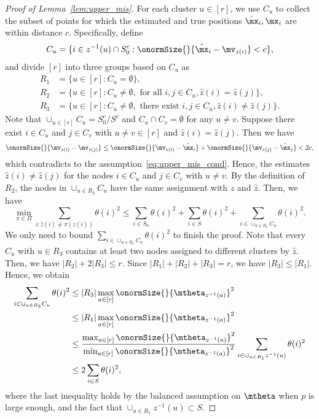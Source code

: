 \documentclass[lettersize,onecolumn,journal]{IEEEtran}
\theoremstyle{definition}
\theoremstyle{definition}
\def\fixme#1#2{\textbf{\color{red}[FIXME (#1): #2]}}
\begin{document}
\begin{proof}[Proof of Lemma~\ref{lem:upper_mis}] 

For each cluster $u\in[r]$, we use $C_u$ to collect the subset of points for which the estimated and true positions $\hat \mx_i, \mx_i$ are within distance $c$. Specifically, define
\begin{equation}
    C_u = \{ i \in z^{-1}(u) \cap S_0^c: \onormSize{}{\hat \mx_i - \mv_{z(i)}} < c \},
\end{equation}
and divide $[r]$ into three groups based on $C_u$ as 
\begin{align}
    R_1 &= \{ u \in [r]: C_u = \emptyset \},\\
    R_2 &= \{ u \in [r]: C_u \neq \emptyset, \text{ for all } i, j \in C_u, \hat z(i) = \hat z(j) \},\\
    R_3 &= \{ u \in [r]: C_u \neq \emptyset, \text{ there exist } i, j \in C_u, \hat z(i) \neq \hat z(j) \}.
\end{align}
Note that $\cup_{u \in [r]}C_u = S_0^c/S^c$ and $C_u \cap C_v = \emptyset$ for any $u \neq v$. Suppose there exist $ i \in C_u$ and $j \in C_v$ with $u \neq v \in [r]$ and $\hat z(i) = \hat z(j)$. Then we have 
\begin{equation}
    \onormSize{}{\mv_{z(i)} - \mv_{z(j)} } \leq  \onormSize{}{\mv_{z(i)} - \hat \mx_{i} } + \onormSize{}{\mv_{z(j)} - \hat \mx_j } < 2c,
\end{equation}
which contradicts to the assumption~\eqref{eq:upper_mis_cond}. Hence, the estimates $\hat z(i) \neq \hat z(j)$ for the nodes $ i \in C_u$ and $j \in C_v$ with $u \neq v$. By the definition of $R_2$, the nodes in $\cup_{u \in R_2} C_u$ have the same assignment with $z$ and $\hat z$. Then, 
we have 
\begin{equation}
    \min_{\pi \in \Pi} \sum_{i : \hat z(i) \neq \pi(z(i))} \theta(i)^2 \leq \sum_{i \in S_0} \theta(i)^2 + \sum_{i \in S} \theta(i)^2 + \sum_{ i \in \cup_{u \in R_3} C_u} \theta(i)^2.
\end{equation}
 We only need to bound $\sum_{ i \in \cup_{u \in R_3} C_u} \theta(i)^2$ to finish the proof. Note that every $C_u$ with $u \in R_3$ contains at least two nodes assigned to different clusters by $\hat z$. Then, we have $|R_2| + 2 |R_3| \leq r$. Since $|R_1| + |R_2| + |R_3| = r$, we have $|R_3| \leq |R_1|$. Hence, we obtain
\begin{align}
    \sum_{ i \in \cup_{u \in R_3} C_u} \theta(i)^2 &\leq |R_3| \max_{a \in [r]} \onormSize{}{\mtheta_{z^{-1}(a)}}^2 \\
    & \leq |R_1| \max_{a \in [r]} \onormSize{}{\mtheta_{z^{-1}(a)}}^2  \\
    & \leq {\max_{a \in [r]} \onormSize{}{\mtheta_{z^{-1}(a)}}^2 \over \min_{a \in [r]} \onormSize{}{\mtheta_{z^{-1}(a)}}^2 } \sum_{i \in \cup_{u \in R_1} z^{-1}(u)} \theta(i)^2\\
    & \leq 2 \sum_{i \in S} \theta(i)^2,
\end{align}
where the last inequality holds by the balanced assumption on $\mtheta$ when $p$ is large enough, and the fact that $ \cup_{u \in R_1} z^{-1}(u) \subset S$.
\end{proof}
\end{document}
